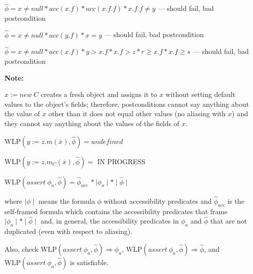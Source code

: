 \documentclass {article}
\newcommand{\fphi}{\widehat{\phi}}
\newcommand{\imp}{\Rightarrow}
\newcommand{\wlp}[2]{\text{WLP}(#1,#2)}
\begin{document}
$\fphi = x \neq null \ast acc(x.f) \ast acc(x.f.f) \ast x.f.f \neq y$ --- should fail, bad postcondition

$\fphi = x \neq null \ast acc(y.f) \ast x = y$ --- should fail, bad postcondition

$\fphi = x \neq null \ast acc(x.f) \ast y > x.f \ast x.f > z \ast r \geq x.f \ast x.f \geq s$ --- should fail, bad postcondition


\textbf{Note:}

$x := new \ C$ creates a fresh object and assigns it to $x$ without setting default values to the object's fields; therefore, postconditions cannot say anything about the value of $x$ other than it does not equal other values (no aliasing with $x$) and they cannot say anything about the values of the fields of $x$.

\vspace{0.5cm}

$\wlp{y := z.m(\overline{x})}{\fphi} = undefined$

\vspace{0.5cm}

$\wlp{y := z.m_C(\overline{x})}{\fphi} = $ IN PROGRESS



\vspace{0.5cm}

$\wlp{assert\ \phi_a}{\fphi} = \fphi_{acc} \ \ast \mid \phi_a \mid \ast \mid \fphi \mid$

where $\mid \phi \mid$ means the formula $\phi$ without accessibility predicates and $\fphi_{acc}$ is the self-framed formula which contains the accessibility predicates that frame $\mid \phi_a \mid \ast \mid \fphi \mid$ and, in general, the accessibility predicates in $\phi_a$ and $\fphi$ that are not duplicated (even with respect to aliasing).

Also, check $\wlp{assert\ \phi_a}{\fphi} \imp \phi_a$, $\wlp{assert\ \phi_a}{\fphi} \imp \fphi$, and $\wlp{assert\ \phi_a}{\fphi}$ is satisfiable.
\end{document}
